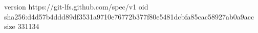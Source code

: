 version https://git-lfs.github.com/spec/v1
oid sha256:d4d57b4ddd89df3531a9710e76772b377f80e5481dcbfa85cac58927ab0a9acc
size 331134
